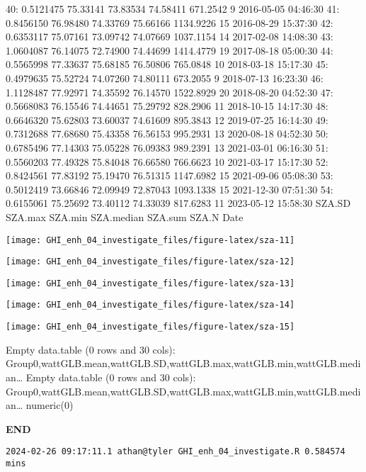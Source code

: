 \documentclass[
  10pt,
  a4paper,oneside]{article}
\begin{document}
40: 0.5121475 75.33141 73.83534 74.58411 671.2542 9 2016-05-05 04:46:30
41: 0.8456150 76.98480 74.33769 75.66166 1134.9226 15 2016-08-29 15:37:30
42: 0.6353117 75.07161 73.09742 74.07669 1037.1154 14 2017-02-08 14:08:30
43: 1.0604087 76.14075 72.74900 74.44699 1414.4779 19 2017-08-18 05:00:30
44: 0.5565998 77.33637 75.68185 76.50806 765.0848 10 2018-03-18 15:17:30
45: 0.4979635 75.52724 74.07260 74.80111 673.2055 9 2018-07-13 16:23:30
46: 1.1128487 77.92971 74.35592 76.14570 1522.8929 20 2018-08-20 04:52:30
47: 0.5668083 76.15546 74.44651 75.29792 828.2906 11 2018-10-15 14:17:30
48: 0.6646320 75.62803 73.60037 74.61609 895.3843 12 2019-07-25 16:14:30
49: 0.7312688 77.68680 75.43358 76.56153 995.2931 13 2020-08-18 04:52:30
50: 0.6785496 77.14303 75.05228 76.09383 989.2391 13 2021-03-01 06:16:30
51: 0.5560203 77.49328 75.84048 76.66580 766.6623 10 2021-03-17 15:17:30
52: 0.8424561 77.83192 75.19470 76.51315 1147.6982 15 2021-09-06 05:08:30
53: 0.5012419 73.66846 72.09949 72.87043 1093.1338 15 2021-12-30 07:51:30
54: 0.6155061 75.25692 73.40112 74.33039 817.6283 11 2023-05-12 15:58:30
SZA.SD SZA.max SZA.min SZA.median SZA.sum SZA.N Date

\begin{center}\texttt{[image: GHI\_enh\_04\_investigate\_files/figure-latex/sza-11]} \end{center}

\begin{center}\texttt{[image: GHI\_enh\_04\_investigate\_files/figure-latex/sza-12]} \end{center}

\begin{center}\texttt{[image: GHI\_enh\_04\_investigate\_files/figure-latex/sza-13]} \end{center}

\begin{center}\texttt{[image: GHI\_enh\_04\_investigate\_files/figure-latex/sza-14]} \end{center}

\begin{center}\texttt{[image: GHI\_enh\_04\_investigate\_files/figure-latex/sza-15]} \end{center}

Empty data.table (0 rows and 30 cols): Group0,wattGLB.mean,wattGLB.SD,wattGLB.max,wattGLB.min,wattGLB.median\ldots{}
Empty data.table (0 rows and 30 cols): Group0,wattGLB.mean,wattGLB.SD,wattGLB.max,wattGLB.min,wattGLB.median\ldots{}
numeric(0)

\textbf{END}

\begin{verbatim}
2024-02-26 09:17:11.1 athan@tyler GHI_enh_04_investigate.R 0.584574 mins
\end{verbatim}
\end{document}
